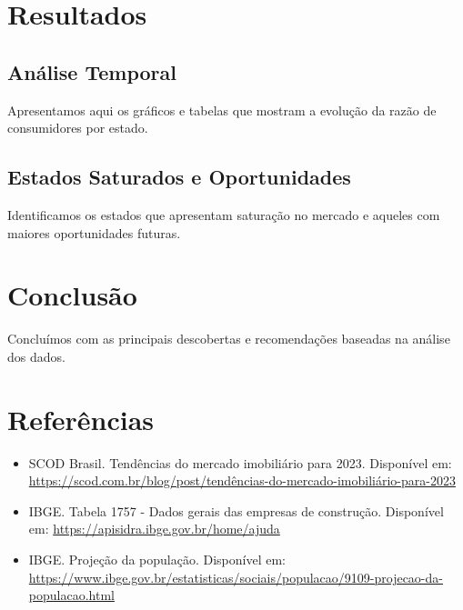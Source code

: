 \documentclass[12pt]{article}
\begin{document}
\section{Resultados} 

\subsection{Análise Temporal} Apresentamos aqui os
gráficos e tabelas que mostram a evolução da razão de consumidores por estado.

\subsection{Estados Saturados e Oportunidades} Identificamos os estados que
apresentam saturação no mercado e aqueles com maiores oportunidades futuras.

\section{Conclusão} Concluímos com as principais descobertas e recomendações
baseadas na análise dos dados.

\section*{Referências} 
\begin{itemize} 
    \item SCOD Brasil. Tendências do mercado
    imobiliário para 2023. Disponível em: \url{https://scod.com.br/blog/post/tendências-do-mercado-imobiliário-para-2023}
    \item IBGE. Tabela 1757 - Dados gerais das empresas de construção. Disponível em: \url{https://apisidra.ibge.gov.br/home/ajuda} 
    \item IBGE. Projeção da população. Disponível em: \url{https://www.ibge.gov.br/estatisticas/sociais/populacao/9109-projecao-da-populacao.html}
\end{itemize}
\end{document}

